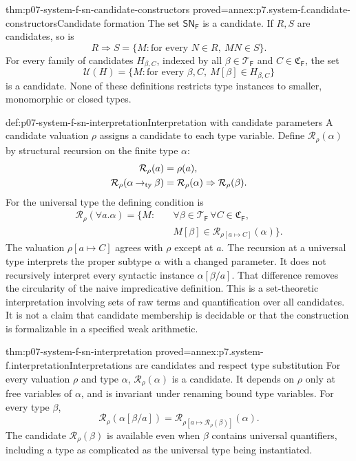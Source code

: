 \begin{hblemma}{thm:p07-system-f-sn-candidate-constructors}
 {proved=annex:p7.system-f.candidate-constructors}{Candidate formation}
The set \(\mathsf{SN}_{\mathsf F}\) is a candidate. If \(R,S\) are
candidates, so is
\[
 R\Rightarrow S=\{M:\text{for every }N\in R,\ MN\in S\}.
\]
For every family of candidates \(H_{\beta,C}\), indexed by all
\(\beta\in\mathcal T_{\mathsf F}\) and \(C\in\mathfrak C_{\mathsf F}\),
the set
\[
 \mathcal U(H)=\{M:\text{for every }\beta,C,\ M[\beta]\in H_{\beta,C}\}
\]
is a candidate. None of these definitions restricts type instances to
smaller, monomorphic or closed types.
\end{hblemma}

\begin{hbdefinition}{def:p07-system-f-sn-interpretation}{Interpretation with candidate parameters}
A candidate valuation \(\rho\) assigns a candidate to each type variable.
Define \(\mathcal R_\rho(\alpha)\) by structural recursion on the
finite type \(\alpha\):
\[
\begin{aligned}
 \mathcal R_\rho(a)&=\rho(a),\\
 \mathcal R_\rho(\alpha\mathbin{\to_{\rm ty}}\beta)
   &=\mathcal R_\rho(\alpha)\Rightarrow\mathcal R_\rho(\beta).
\end{aligned}
\]
For the universal type the defining condition is
\[
\begin{aligned}
 \mathcal R_\rho(\forall a.\alpha)=\{M:\quad&
       \forall\beta\in\mathcal T_{\mathsf F}\,
       \forall C\in\mathfrak C_{\mathsf F},\\
       &M[\beta]\in\mathcal R_{\rho[a\mapsto C]}(\alpha)\}.
\end{aligned}
\]
The valuation \(\rho[a\mapsto C]\) agrees with \(\rho\) except at
\(a\). The recursion at a universal type interprets the proper subtype
\(\alpha\) with a changed parameter. It does not recursively interpret
every syntactic instance \(\alpha[\beta/a]\). That difference removes
the circularity of the naive impredicative definition.
This is a set-theoretic interpretation involving sets of raw terms and
quantification over all candidates. It is not a claim that candidate
membership is decidable or that the construction is formalizable in a
specified weak arithmetic.
\end{hbdefinition}

\begin{hblemma}{thm:p07-system-f-sn-interpretation}
 {proved=annex:p7.system-f.interpretation}{Interpretations are candidates and respect type substitution}
For every valuation \(\rho\) and type \(\alpha\),
\(\mathcal R_\rho(\alpha)\) is a candidate. It depends on \(\rho\)
only at free variables of \(\alpha\), and is invariant under renaming
bound type variables. For every type \(\beta\),
\[
 \mathcal R_\rho(\alpha[\beta/a])
   =\mathcal R_{\rho[a\mapsto\mathcal R_\rho(\beta)]}(\alpha).
\]
The candidate \(\mathcal R_\rho(\beta)\) is available even when
\(\beta\) contains universal quantifiers, including a type as complicated
as the universal type being instantiated.
\end{hblemma}

